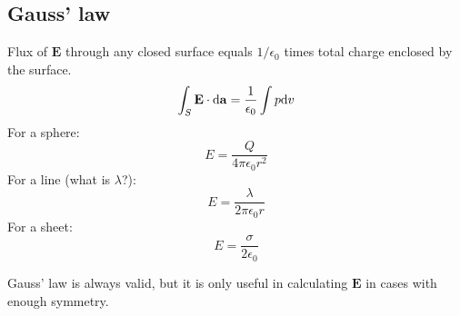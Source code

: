 \subsection*{Gauss' law}
Flux of $\mathbf{E}$ through any closed surface equals $1/\epsilon_0$ times total charge enclosed
by the surface.
\begin{equation*}
  \int_S \mathbf{E} \cdot \differential \mathbf{a} = \frac{1}{\epsilon_0} \int p \differential v
\end{equation*}
For a sphere:
\begin{equation*}
  E = \frac{Q}{4\pi\epsilon_0r^2}
\end{equation*}
For a line (what is $\lambda$?):
\begin{equation*}
  E = \frac{\lambda}{2\pi\epsilon_0r}
\end{equation*}
For a sheet:
\begin{equation*}
  E = \frac{\sigma}{2\epsilon_0}
\end{equation*}

Gauss' law is always valid, but it is only useful in calculating $\mathbf{E}$ in cases with enough symmetry.